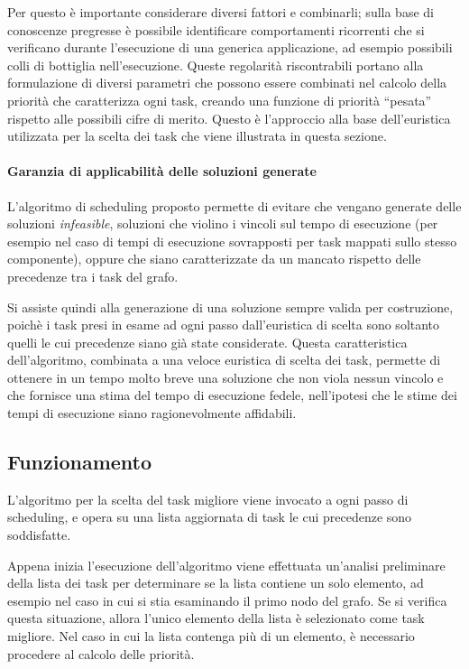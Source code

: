 Per questo è importante considerare diversi fattori e combinarli; sulla 
base di conoscenze pregresse è possibile identificare comportamenti 
ricorrenti che si verificano durante l'esecuzione di una generica applicazione, 
ad esempio possibili colli di bottiglia nell'esecuzione. Queste regolarità 
riscontrabili portano alla formulazione di diversi parametri che possono essere 
combinati nel calcolo della priorità che caratterizza ogni task, creando una 
funzione di priorità ``pesata'' rispetto alle possibili cifre di merito. Questo 
è l'approccio alla base dell'euristica utilizzata per la scelta dei task che 
viene illustrata in questa sezione.

\paragraph{Garanzia di applicabilità delle soluzioni generate}
L'algoritmo di scheduling proposto permette di evitare che vengano generate 
delle soluzioni \emph{infeasible}, soluzioni che violino i vincoli sul tempo di 
esecuzione (per esempio nel caso di tempi di esecuzione sovrapposti per task 
mappati sullo stesso componente), oppure che siano caratterizzate da un mancato 
rispetto delle precedenze tra i task del grafo.

Si assiste quindi alla generazione di una soluzione sempre valida per 
costruzione, poichè i task presi in esame ad ogni passo dall'euristica di 
scelta sono soltanto quelli le cui precedenze siano già state considerate. 
Questa caratteristica dell'algoritmo, combinata a una veloce euristica di scelta 
dei task, permette di ottenere in un tempo molto breve una soluzione che non 
viola nessun vincolo e che fornisce una stima del tempo di esecuzione fedele, 
nell'ipotesi che le stime dei tempi di esecuzione siano ragionevolmente 
affidabili.


\subsection{Funzionamento}
L'algoritmo per la scelta del task migliore viene invocato a ogni passo di 
scheduling, e opera su una lista aggiornata di task le cui precedenze sono 
soddisfatte.

Appena inizia l'esecuzione dell'algoritmo viene effettuata un'analisi 
preliminare della lista dei task per determinare se la lista contiene un solo 
elemento, ad esempio nel caso in cui si stia esaminando il primo nodo del 
grafo. Se si verifica questa situazione, allora l'unico elemento della lista è 
selezionato come task migliore. Nel caso in cui la lista contenga più di un 
elemento, è necessario procedere al calcolo delle priorità.

